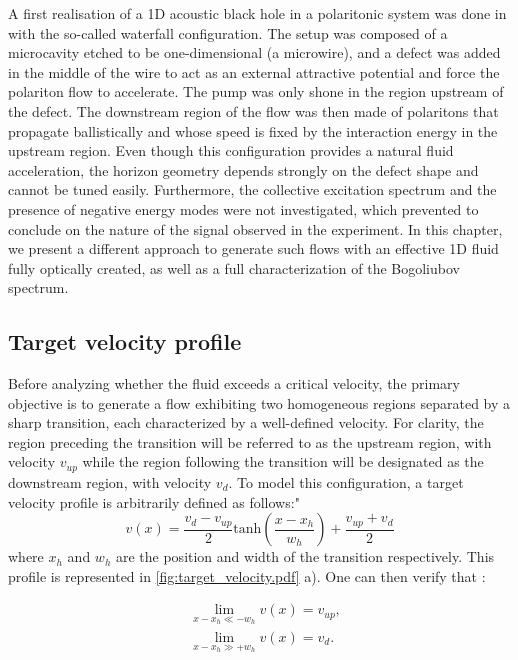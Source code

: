 A first realisation of a 1D acoustic black hole in a polaritonic system was done in \cite{nguyen_acoustic_2015} with the so-called waterfall configuration. 
The setup was composed of a microcavity etched to be one-dimensional (a microwire), and a defect was added in the middle of the wire to act as an external attractive potential and force the polariton flow to accelerate. The pump was only shone in the region upstream of the defect. The downstream region of the flow was then made of polaritons that propagate ballistically and whose speed is fixed by the interaction energy
in the upstream region.
Even though this configuration provides a natural fluid acceleration, the horizon geometry depends strongly on the defect shape and cannot be tuned easily.  Furthermore, the collective excitation spectrum and the presence of negative energy modes were not investigated, which 
prevented to conclude on the nature of the signal observed in the experiment. In this chapter, we present a different approach to generate such flows with an effective 1D fluid fully optically created, as well as a full characterization of the Bogoliubov spectrum.

\subsection{Target velocity profile}
Before analyzing whether the fluid exceeds a critical velocity, the primary objective is to generate a flow exhibiting two homogeneous regions separated by a sharp transition, each characterized by a well-defined velocity. For clarity, the region preceding the transition will be referred to as the upstream region, with velocity $v_{up}$ while the region following the transition will be designated as the downstream region, with velocity $v_{d}$.
To model this configuration, a target velocity profile is arbitrarily defined as follows:"
\begin{equation}
    v(x)= \frac{v_{d}-v_{up}}{2}\mathrm{tanh}(\frac{x-x_h}{w_h})+\frac{v_{up}+v_{d}}{2}
    \label{eq:target_velocity}
\end{equation}
where $x_h$ and $w_h$ are the position and width of the transition respectively. This profile is represented in \autoref{fig:target_velocity.pdf} a).
One can then verify that :

\begin{subequations}
    \begin{align}
    &\lim\limits_{x-x_h\ll-w_h} v(x) = v_{up},\\
    &\lim\limits_{x-x_h\gg+w_h} v(x) = v_{d}.
    \end{align}
\end{subequations}

